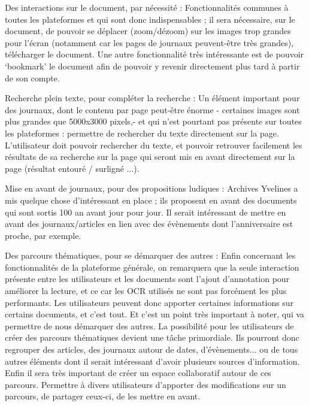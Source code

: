     Des interactions sur le document, par nécessité : Fonctionnalités communes à toutes les plateformes et qui sont donc indispensables ;
    il sera nécessaire, sur le document, de pouvoir se déplacer (zoom/dézoom) sur les images trop grandes pour l’écran
    (notamment car les pages de journaux peuvent-être très grandes), télécharger le document. Une autre fonctionnalité
    très intéressante est de pouvoir ‘bookmark’ le document afin de pouvoir y revenir directement plus tard à partir de son compte.

    Recherche plein texte, pour compléter la recherche : Un élément important pour des journaux, dont le contenu par page
    peut-être énorme - certaines images sont plus grandes que 5000x3000 pixels,- et qui n’est pourtant pas présente
    sur toutes les plateformes : permettre de rechercher du texte directement sur la page. L’utilisateur doit pouvoir rechercher du texte,
    et pouvoir retrouver facilement les résultats de sa recherche sur la page qui seront mis en avant directement sur la page
    (résultat entouré / surligné ...).

    Mise en avant de journaux, pour des propositions ludiques : Archives Yvelines a mis quelque chose d’intéressant en place ;
    ils proposent en avant des documents qui sont sortis 100 an avant jour pour jour. Il serait intéressant de mettre en avant
    des journaux/articles en lien avec des évènements dont l’anniversaire est proche, par exemple.

    Des parcours thématiques, pour se démarquer des autres : Enfin concernant les fonctionnalités de la plateforme générale,
    on remarquera que la seule interaction présente entre les utilisateurs et les documents sont l’ajout d’annotation
    pour améliorer la lecture, et ce car les OCR utilisés ne sont pas forcément les plus performants. Les utilisateurs
    peuvent donc apporter certaines informations sur certains documents, et c’est tout. Et c’est un point très important à noter,
    qui va permettre de nous démarquer des autres.  La possibilité pour les utilisateurs de créer des parcours thématiques devient
    une tâche primordiale. Ils pourront donc regrouper des articles, des journaux autour de dates, d’évènements...
    ou de tous autres éléments dont il serait intéressant d’avoir plusieurs sources d’information. Enfin il sera très important
    de créer un espace collaboratif autour de ces parcours. Permettre à divers utilisateurs d’apporter des modifications sur un parcours,
    de partager ceux-ci, de les mettre en avant.

